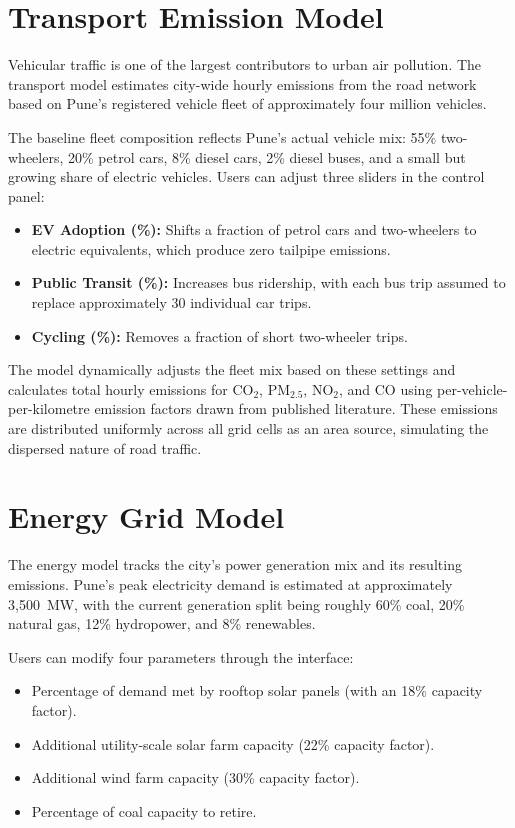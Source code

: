 \documentclass[a4paper, 12pt]{report}
\begin{document}
\section{Transport Emission Model}
Vehicular traffic is one of the largest contributors to urban air pollution. The transport model estimates city-wide hourly emissions from the road network based on Pune's registered vehicle fleet of approximately four million vehicles.

The baseline fleet composition reflects Pune's actual vehicle mix: 55\% two-wheelers, 20\% petrol cars, 8\% diesel cars, 2\% diesel buses, and a small but growing share of electric vehicles. Users can adjust three sliders in the control panel:

\begin{itemize}
\item \textbf{EV Adoption (\%):} Shifts a fraction of petrol cars and two-wheelers to electric equivalents, which produce zero tailpipe emissions.
\item \textbf{Public Transit (\%):} Increases bus ridership, with each bus trip assumed to replace approximately 30 individual car trips.
\item \textbf{Cycling (\%):} Removes a fraction of short two-wheeler trips.
\end{itemize}

The model dynamically adjusts the fleet mix based on these settings and calculates total hourly emissions for CO$_2$, PM$_{2.5}$, NO$_2$, and CO using per-vehicle-per-kilometre emission factors drawn from published literature. These emissions are distributed uniformly across all grid cells as an area source, simulating the dispersed nature of road traffic.

\section{Energy Grid Model}
The energy model tracks the city's power generation mix and its resulting emissions. Pune's peak electricity demand is estimated at approximately 3,500~MW, with the current generation split being roughly 60\% coal, 20\% natural gas, 12\% hydropower, and 8\% renewables.

Users can modify four parameters through the interface:
\begin{itemize}
\item Percentage of demand met by rooftop solar panels (with an 18\% capacity factor).
\item Additional utility-scale solar farm capacity (22\% capacity factor).
\item Additional wind farm capacity (30\% capacity factor).
\item Percentage of coal capacity to retire.
\end{itemize}
\end{document}

